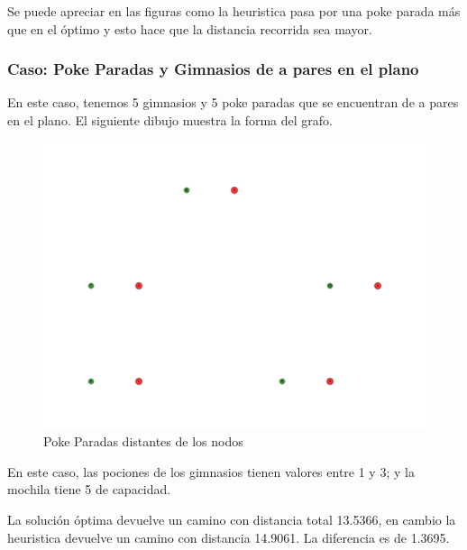 Se puede apreciar en las figuras como la heuristica pasa por una poke parada más que en el óptimo y esto hace que la distancia recorrida sea mayor.


\subsubsection{Caso: Poke Paradas y Gimnasios de a pares en el plano}

En este caso, tenemos 5 gimnasios y 5 poke paradas que se encuentran de a pares en el plano. El siguiente dibujo muestra la forma del grafo.

\begin{figure}[H]
  \begin{center}
    \includegraphics[scale=0.4]{imagenes/test2.pdf}
    \caption{Poke Paradas distantes de los nodos}
    \label{fig:ej2_caso2}
  \end{center}
\end{figure}

En este caso, las pociones de los gimnasios tienen valores entre 1 y 3; y la mochila tiene 5 de capacidad.

La solución óptima devuelve un camino con distancia total 13.5366, en cambio la heuristica devuelve un camino con distancia 14.9061. La diferencia es de 1.3695.

